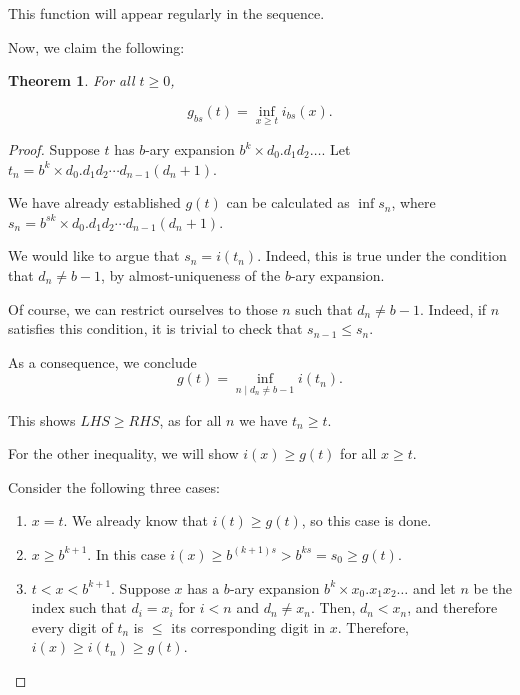 \documentclass[11pt, reqno]{amsart}
\newtheorem{theorem}{Theorem}
\begin{document}
This function will appear regularly in the sequence.

Now, we claim the following:

\begin{theorem} \label{ginfi}
For all $t \geq 0$,

\[g_{bs}(t) = \inf_{x \geq t} i_{bs}(x).\]
\end{theorem}

\begin{proof}
Suppose $t$ has $b$-ary expansion $b^k \times d_0 . d_1 d_2 \dots$. Let $t_n = b^k \times d_0 . d_1 d_2 \cdots d_{n-1} (d_n + 1)$.

We have already established $g(t)$ can be calculated as $\inf s_n$, where $s_n = b^{sk} \times d_0 . d_1 d_2 \cdots d_{n-1} (d_n + 1)$.

We would like to argue that $s_n = i(t_n)$. Indeed, this is true under the condition that $d_n \neq b-1$, by almost-uniqueness of the $b$-ary expansion.

Of course, we can restrict ourselves to those $n$ such that $d_n \neq b-1$. Indeed, if $n$ satisfies this condition, it is trivial to check that $s_{n-1} \leq s_n$.

As a consequence, we conclude
\[g(t) = \inf_{n \mid d_n \neq b-1} i(t_n).\]

This shows $LHS \geq RHS$, as for all $n$ we have $t_n \geq t$.

For the other inequality, we will show $i(x) \geq g(t)$ for all $x \geq t$.

Consider the following three cases:


\begin{enumerate}[label=\textbf{Case \arabic*:}]

\item $x = t$. We already know that $i(t) \geq g(t)$, so this case is done.

\item $x \geq b^{k+1}$. In this case $i(x) \geq b^{(k+1)s} > b^{ks} = s_0 \geq g(t)$.

\item $t < x < b^{k+1}$. Suppose $x$ has a $b$-ary expansion $b^k \times x_0 . x_1 x_2 \dots$ and let $n$ be the index such that $d_i = x_i$ for $i < n$ and $d_n \neq x_n$. Then, $d_n < x_n$, and therefore every digit of $t_n$ is $\leq$ its corresponding digit in $x$. Therefore, $i(x) \geq i(t_n) \geq g(t)$.
\end{enumerate}
\end{proof}
\end{document}
